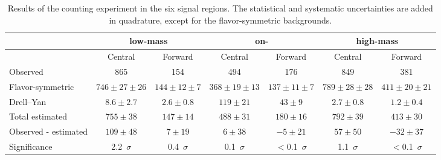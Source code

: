 
\begin{table}[hbtp]
 \renewcommand{\arraystretch}{1.3}
 \setlength{\belowcaptionskip}{6pt}
 \scriptsize
 \centering
 \caption{Results of the counting experiment in the six signal regions.
     The statistical and systematic uncertainties are added in quadrature, except for the flavor-symmetric backgrounds.
     }
  \label{tab:METresults2012}
  \begin{tabular}{l| cc | cc | cc}

    							& \multicolumn{2}{c}{low-mass} & \multicolumn{2}{c}{on-\Z} & \multicolumn{2}{c}{high-mass} \\ 

    \hline
                                &  Central        & Forward  &  Central  & Forward   &  Central        & Forward \\ 

    \hline
        Observed       &  865                   & 154              &  494            &  176       &   849           &   381    \\

    \hline
        Flavor-symmetric    & $746\pm27\pm26$        & $144\pm12\pm7$  &  $368\pm19\pm13$ & $137\pm11\pm7$ & $789\pm28\pm28$ & $411\pm20\pm21$ \\

            Drell--Yan          & $8.6\pm2.7$            & $2.6\pm0.8$      & $119\pm21$ & $43\pm9$ & $2.7\pm0.8$ & $1.2\pm0.4$ \\

    \hline
            Total estimated          & $755\pm38$            & $147\pm14$      & $488\pm31$ & $180\pm16$ & $792\pm39$ & $413\pm30$ \\

    \hline
         Observed - estimated  & $109\pm48$      & $7\pm19$ & $6\pm38 $ & $-5\pm21$ & $57\pm50$ & $-32\pm37 $ \\ 

    \hline
   Significance      & 2.2~$\sigma$    &  0.4~$\sigma$  & 0.1~$\sigma$ & $<$0.1~$\sigma$ & 1.1~$\sigma$ & $<$0.1~$\sigma$ \\ 


  \end{tabular}
\end{table}


